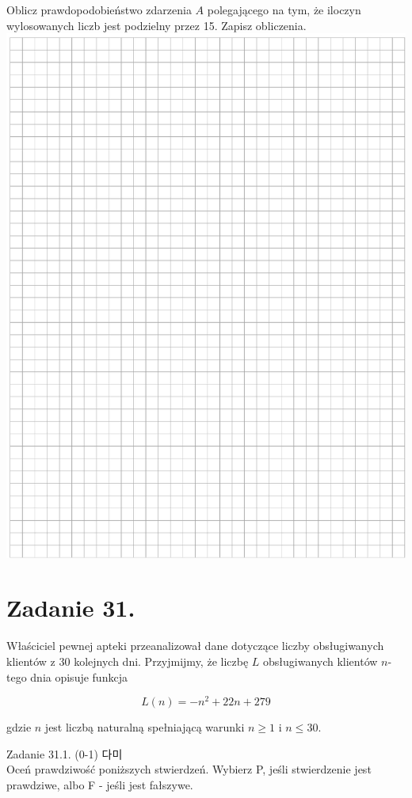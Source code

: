 \documentclass[10pt]{article}
\begin{document}
Oblicz prawdopodobieństwo zdarzenia \(A\) polegającego na tym, że iloczyn wylosowanych liczb jest podzielny przez 15. Zapisz obliczenia.\\
\includegraphics[max width=\textwidth, center]{2024_11_21_51cb67544fb9b029f01cg-26}

\section*{Zadanie 31.}
Właściciel pewnej apteki przeanalizował dane dotyczące liczby obsługiwanych klientów z 30 kolejnych dni. Przyjmijmy, że liczbę \(L\) obsługiwanych klientów \(n\)-tego dnia opisuje funkcja

\[
L(n)=-n^{2}+22 n+279
\]

gdzie \(n\) jest liczbą naturalną spełniającą warunki \(n \geq 1\) i \(n \leq 30\).

Zadanie 31.1. (0-1) 다미\\
Oceń prawdziwość poniższych stwierdzeń. Wybierz P, jeśli stwierdzenie jest prawdziwe, albo F - jeśli jest fałszywe.
\end{document}
